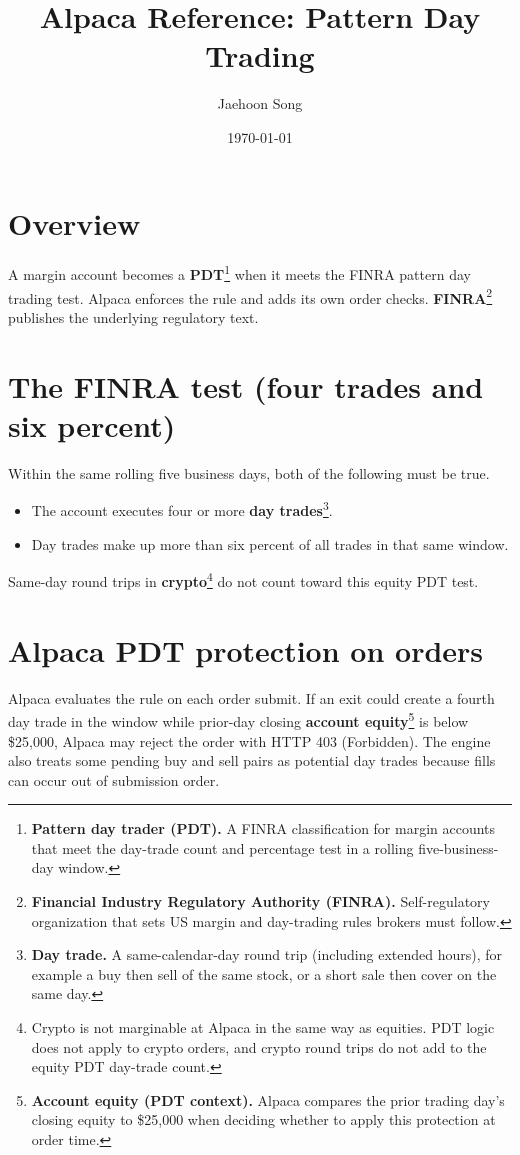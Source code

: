 \documentclass{article}
\title{Alpaca Reference: Pattern Day Trading}
\author{Jaehoon Song}
\date{\today}
\newcommand{\equitythreshold}{\$25,000}
\begin{document}
\maketitle

\section{Overview}
A margin account becomes a \textbf{PDT}\footnote{\textbf{Pattern day trader (PDT).} A FINRA classification for margin accounts that meet the day-trade count and percentage test in a rolling five-business-day window.} when it meets the FINRA pattern day trading test. Alpaca enforces the rule and adds its own order checks. \textbf{FINRA}\footnote{\textbf{Financial Industry Regulatory Authority (FINRA).} Self-regulatory organization that sets US margin and day-trading rules brokers must follow.} publishes the underlying regulatory text.

\section{The FINRA test (four trades and six percent)}
Within the same rolling five business days, both of the following must be true.
\begin{itemize}
  \item The account executes four or more \textbf{day trades}\footnote{\textbf{Day trade.} A same-calendar-day round trip (including extended hours), for example a buy then sell of the same stock, or a short sale then cover on the same day.}.
  \item Day trades make up more than six percent of all trades in that same window.
\end{itemize}
Same-day round trips in \textbf{crypto}\footnote{Crypto is not marginable at Alpaca in the same way as equities. PDT logic does not apply to crypto orders, and crypto round trips do not add to the equity PDT day-trade count.} do not count toward this equity PDT test.

\section{Alpaca PDT protection on orders}
Alpaca evaluates the rule on each order submit. If an exit could create a fourth day trade in the window while prior-day closing \textbf{account equity}\footnote{\textbf{Account equity (PDT context).} Alpaca compares the prior trading day's closing equity to \equitythreshold{} when deciding whether to apply this protection at order time.} is below \equitythreshold, Alpaca may reject the order with HTTP 403 (Forbidden). The engine also treats some pending buy and sell pairs as potential day trades because fills can occur out of submission order.
\end{document}
